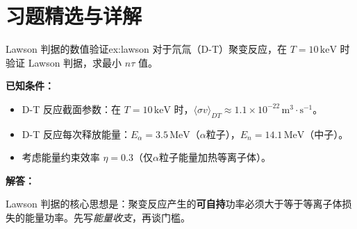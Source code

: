 

\section{习题精选与详解}

\begin{example}{Lawson 判据的数值验证}{ex:lawson}
对于氘氚（D-T）聚变反应，在 $T=10\,\mathrm{keV}$ 时验证 Lawson 判据，求最小 $n\tau$ 值。
\end{example}

\textbf{已知条件：}
\begin{itemize}
    \item D-T 反应截面参数：在 $T=10\,\mathrm{keV}$ 时，$\langle\sigma v\rangle_{DT} \approx 1.1\times10^{-22}\,\mathrm{m^3\cdot s^{-1}}$。
    \item D-T 反应每次释放能量：$E_{\alpha}=3.5\,\mathrm{MeV}$（$\alpha$粒子），$E_n=14.1\,\mathrm{MeV}$（中子）。
    \item 考虑能量约束效率 $\eta=0.3$（仅$\alpha$粒子能量加热等离子体）。
\end{itemize}

\textbf{解答：}

Lawson 判据的核心思想是：聚变反应产生的\textbf{可自持}功率必须大于等于等离子体损失的能量功率。先写\emph{能量收支}，再谈门槛。

